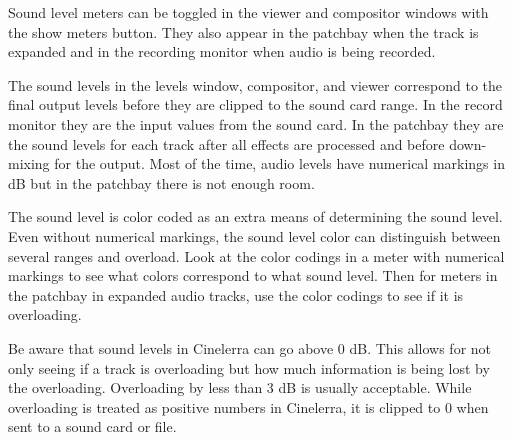 Sound level meters can be toggled in the viewer and compositor windows with the show meters button.  
They also appear in the patchbay when the track is expanded and in the recording monitor when audio is being recorded. 

The sound levels in the levels window, compositor, and viewer correspond to the final output levels before they are clipped to the sound card range.  
In the record monitor they are the input values from the sound card.  
In the patchbay they are the sound levels for each track after all effects are processed and before down-mixing for the output.  
Most of the time, audio levels have numerical markings in dB but in the patchbay there is not enough room.



The sound level is color coded as an extra means of determining the sound level.  
Even without numerical markings, the sound level color can distinguish between several ranges and overload.  
Look at the color codings in a meter with numerical markings to see what colors correspond to what sound level.  
Then for meters in the patchbay in expanded audio tracks, use the color codings to see if it is overloading.

Be aware that sound levels in Cinelerra can go above 0 dB.  
This allows for not only seeing if a track is overloading but how much information is being lost by the overloading.  
Overloading by less than 3 dB is usually acceptable.  
While overloading is treated as positive numbers in Cinelerra, it is clipped to 0 when sent to a sound card or file.







